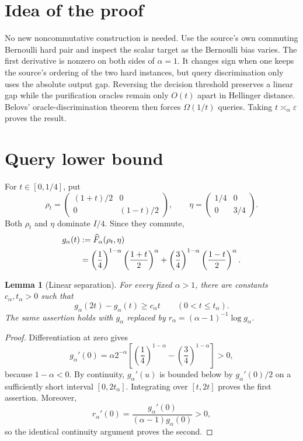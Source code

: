 \documentclass[10pt]{article}
\newtheorem{lemma}[theorem]{Lemma}
\newcommand{\Fh}{\widehat F}
\newcommand{\eps}{\varepsilon}
\begin{document}
\section{Idea of the proof}

No new noncommutative construction is needed.  Use the source's own commuting
Bernoulli hard pair and inspect the scalar target as the Bernoulli bias varies.
The first derivative is nonzero on both sides of $\alpha=1$.  It changes sign
when one keeps the source's ordering of the two hard instances, but query
discrimination only uses the absolute output gap.  Reversing the decision
threshold preserves a linear gap while the purification oracles remain only
$O(t)$ apart in Hellinger distance.  Belovs' oracle-discrimination theorem then
forces $\Omega(1/t)$ queries.  Taking $t\asymp_\alpha\eps$ proves the result.

\section{Query lower bound}

For $t\in[0,1/4]$, put
\begin{equation}\label{eq:states}
 \rho_t=\begin{pmatrix}(1+t)/2&0\\0&(1-t)/2\end{pmatrix},
 \qquad
 \eta=\begin{pmatrix}1/4&0\\0&3/4\end{pmatrix}.
\end{equation}
Both $\rho_t$ and $\eta$ dominate $I/4$.  Since they commute,
\begin{align}
 g_\alpha(t)
 &:=\Fh_\alpha(\rho_t,\eta) \label{eq:g}\\
 &=\left(\frac14\right)^{1-\alpha}
       \left(\frac{1+t}{2}\right)^\alpha
   +\left(\frac34\right)^{1-\alpha}
       \left(\frac{1-t}{2}\right)^\alpha .\notag
\end{align}

\begin{lemma}[Linear separation]\label{lem:gap}
For every fixed $\alpha>1$, there are constants $c_\alpha,t_\alpha>0$
such that
\[
 g_\alpha(2t)-g_\alpha(t)\geq c_\alpha t
 \qquad(0<t\leq t_\alpha).
\]
The same assertion holds with $g_\alpha$ replaced by
$r_\alpha=(\alpha-1)^{-1}\log g_\alpha$.
\end{lemma}

\begin{proof}
Differentiation at zero gives
\begin{equation}\label{eq:derivative}
 g_\alpha'(0)
 =\alpha2^{-\alpha}\left[
       \left(\frac14\right)^{1-\alpha}
      -\left(\frac34\right)^{1-\alpha}\right]>0,
\end{equation}
because $1-\alpha<0$.  By continuity, $g_\alpha'(u)$ is bounded below by
$g_\alpha'(0)/2$ on a sufficiently short interval $[0,2t_\alpha]$.
Integrating over $[t,2t]$ proves the first assertion.  Moreover,
\[
 r_\alpha'(0)=\frac{g_\alpha'(0)}
 { (\alpha-1)g_\alpha(0)}>0,
\]
so the identical continuity argument proves the second.
\end{proof}
\end{document}
